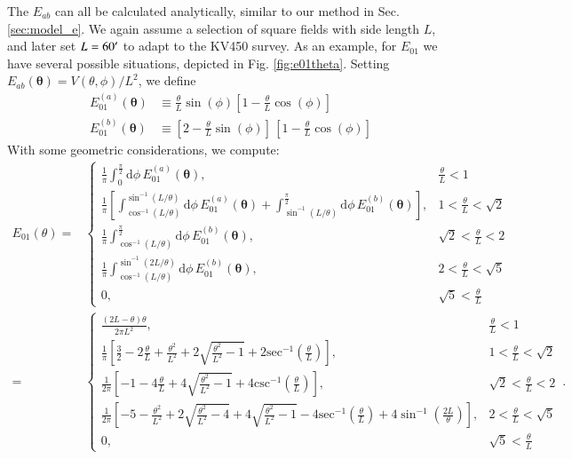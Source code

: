 \documentclass[referee]{aa} %
\renewcommand{\[}{\begin{equation}}
\renewcommand{\]}{\end{equation}}
\renewcommand{\rm}{\mathrm}
\def\inv{^{-1}}
\def\b#1{\bm{#1}}
\def\d{\rm{d}}
\begin{document}
\begin{appendix}
The $E_{ab}$ can all be calculated analytically, similar to our method in Sec. \ref{sec:model_e}. We again assume a selection of square fields with side length $L$, and later set $L=60^\prime$ to adapt to the KV450 survey. As an example, for $E_{01}$ we have several possible situations, depicted in Fig. \ref{fig:e01theta}. Setting $E_{ab}(\b\theta) = V(\theta,\phi)/L^2$, we define \begin{align}
E_{01}^{(a)}(\b\theta) & \equiv \frac{\theta}{L}\sin(\phi)[1-\frac{\theta}{L}\cos(\phi)] \nonumber\\
E_{01}^{(b)}(\b\theta) & \equiv [2-\frac{\theta}{L}\sin(\phi)]\, [1-\frac{\theta}{L}\cos(\phi)]
\end{align}
With some geometric considerations, we compute:
{
\begingroup
\addtolength{\jot}{1em}
\begin{align}
E_{01}(\theta) = & \begin{cases}
\frac{1}{\pi}\int_0^{\frac{\pi}{2}} \d\phi\, E_{01}^{(a)}(\b\theta), & \frac{\theta}{L} < 1 \\[10pt]
 \frac{1}{\pi}  \left[\int_{\cos\inv(L/\theta)}^{\sin\inv(L/\theta)}\d\phi\,E_{01}^{(a)}(\b\theta) + \int_{\sin\inv(L/\theta)}^{\frac{\pi}{2}}\d\phi\, E_{01}^{(b)}(\b\theta) \right],  & 1 < \frac{\theta}{L} < \sqrt{2} \\[10pt]
 \frac{1}{\pi} \int_{\cos\inv(L/\theta)}^{\frac{\pi}{2}}\d\phi\, E_{01}^{(b)}(\b\theta), & \sqrt{2}<\frac{\theta}{L}<2 \\[10pt]
\frac{1}{\pi} \int_{\cos\inv(L/\theta)}^{\sin\inv(2L/\theta)}\d\phi\, E_{01}^{(b)}(\b\theta), & 2<\frac{\theta}{L}<\sqrt{5} \\[10pt]
 0, & \sqrt{5}<\frac{\theta}{L}
\end{cases}\nonumber\\
 = & \begin{cases}
 \frac{(2L-\theta)\theta}{2\pi L^2}, & \frac{\theta}{L} < 1 \\[10pt]
 \frac{1}{\pi}\left[\frac{3}{2}- 2\frac{\theta}{L}+\frac{\theta^2}{L^2}+2\sqrt{\frac{\theta^2}{L^2}-1}+2\rm{sec\inv}\left(\frac{\theta}{L}\right)\right], & 1<\frac{\theta}{L}<\sqrt{2} \\[10pt]
 \frac{1}{2\pi}\left[-1-4\frac{\theta}{L}+4\sqrt{\frac{\theta^2}{L^2}-1}+4\rm{csc\inv}\left(\frac{\theta}{L}\right)\right], & \sqrt{2} < \frac{\theta}{L} < 2 \\[10pt]
 \frac{1}{2\pi}\left[-5-\frac{\theta^2}{L^2}+2\sqrt{\frac{\theta^2}{L^2}-4}+4\sqrt{\frac{\theta^2}{L^2}-1}-4\rm{sec\inv}\left(\frac{\theta}{L}\right)+4\sin\inv\left(\frac{2L}{\theta}\right)\right], & 2 < \frac{\theta}{L} < \sqrt{5} \\[10pt]
 0, & \sqrt{5}<\frac{\theta}{L}
 \end{cases}\, .
\end{align}
\endgroup
}


\end{appendix}
\end{document}
